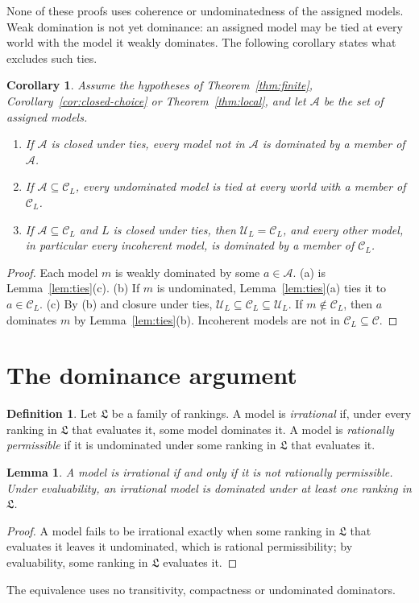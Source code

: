 \documentclass[11pt]{article}
\newtheorem{lemma}[theorem]{Lemma}
\newtheorem{corollary}[theorem]{Corollary}
\theoremstyle{definition}
\newtheorem{definition}[theorem]{Definition}
\newcommand{\C}{\mathcal C}
\newcommand{\U}{\mathcal U}
\newcommand{\Lf}{\mathfrak L}
\begin{document}
None of these proofs uses coherence or undominatedness of the assigned models. Weak domination is not yet dominance: an assigned model may be tied at every world with the model it weakly dominates. The following corollary states what excludes such ties.

\begin{corollary}\label{cor:coherent-assigned}
Assume the hypotheses of Theorem~\ref{thm:finite}, Corollary~\ref{cor:closed-choice} or Theorem~\ref{thm:local}, and let $\mathcal A$ be the set of assigned models.
\begin{enumerate}[label=(\alph*)]
\item If $\mathcal A$ is closed under ties, every model not in $\mathcal A$ is dominated by a member of $\mathcal A$.
\item If $\mathcal A\subseteq\C_L$, every undominated model is tied at every world with a member of $\C_L$.
\item If $\mathcal A\subseteq\C_L$ and $L$ is closed under ties, then $\U_L=\C_L$, and every other model, in particular every incoherent model, is dominated by a member of $\C_L$.
\end{enumerate}
\end{corollary}
\begin{proof}
Each model $m$ is weakly dominated by some $a\in\mathcal A$. (a) is Lemma~\ref{lem:ties}(c). (b) If $m$ is undominated, Lemma~\ref{lem:ties}(a) ties it to $a\in\C_L$. (c) By (b) and closure under ties, $\U_L\subseteq\C_L\subseteq\U_L$. If $m\notin\C_L$, then $a$ dominates $m$ by Lemma~\ref{lem:ties}(b). Incoherent models are not in $\C_L\subseteq\C$.
\end{proof}

\section{The dominance argument}\label{sec:conclusion}

\begin{definition}\label{def:permissibility}
Let $\Lf$ be a family of rankings. A model is \emph{irrational} if, under every ranking in $\Lf$ that evaluates it, some model dominates it. A model is \emph{rationally permissible} if it is undominated under some ranking in $\Lf$ that evaluates it.
\end{definition}

\begin{lemma}\label{lem:complement}
A model is irrational if and only if it is not rationally permissible. Under evaluability, an irrational model is dominated under at least one ranking in $\Lf$.
\end{lemma}
\begin{proof}
A model fails to be irrational exactly when some ranking in $\Lf$ that evaluates it leaves it undominated, which is rational permissibility; by evaluability, some ranking in $\Lf$ evaluates it.
\end{proof}
The equivalence uses no transitivity, compactness or undominated dominators.
\end{document}
